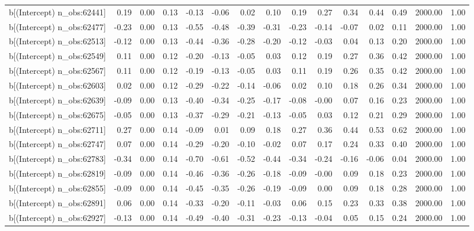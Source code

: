 \begin{table}[ht]
\begin{tabular}{rrrrrrrrrrrrrrr}
  b[(Intercept) n\_obs:62441] & 0.19 & 0.00 & 0.13 & -0.13 & -0.06 & 0.02 & 0.10 & 0.19 & 0.27 & 0.34 & 0.44 & 0.49 & 2000.00 & 1.00 \\ 
  b[(Intercept) n\_obs:62477] & -0.23 & 0.00 & 0.13 & -0.55 & -0.48 & -0.39 & -0.31 & -0.23 & -0.14 & -0.07 & 0.02 & 0.11 & 2000.00 & 1.00 \\ 
  b[(Intercept) n\_obs:62513] & -0.12 & 0.00 & 0.13 & -0.44 & -0.36 & -0.28 & -0.20 & -0.12 & -0.03 & 0.04 & 0.13 & 0.20 & 2000.00 & 1.00 \\ 
  b[(Intercept) n\_obs:62549] & 0.11 & 0.00 & 0.12 & -0.20 & -0.13 & -0.05 & 0.03 & 0.12 & 0.19 & 0.27 & 0.36 & 0.42 & 2000.00 & 1.00 \\ 
  b[(Intercept) n\_obs:62567] & 0.11 & 0.00 & 0.12 & -0.19 & -0.13 & -0.05 & 0.03 & 0.11 & 0.19 & 0.26 & 0.35 & 0.42 & 2000.00 & 1.00 \\ 
  b[(Intercept) n\_obs:62603] & 0.02 & 0.00 & 0.12 & -0.29 & -0.22 & -0.14 & -0.06 & 0.02 & 0.10 & 0.18 & 0.26 & 0.34 & 2000.00 & 1.00 \\ 
  b[(Intercept) n\_obs:62639] & -0.09 & 0.00 & 0.13 & -0.40 & -0.34 & -0.25 & -0.17 & -0.08 & -0.00 & 0.07 & 0.16 & 0.23 & 2000.00 & 1.00 \\ 
  b[(Intercept) n\_obs:62675] & -0.05 & 0.00 & 0.13 & -0.37 & -0.29 & -0.21 & -0.13 & -0.05 & 0.03 & 0.12 & 0.21 & 0.29 & 2000.00 & 1.00 \\ 
  b[(Intercept) n\_obs:62711] & 0.27 & 0.00 & 0.14 & -0.09 & 0.01 & 0.09 & 0.18 & 0.27 & 0.36 & 0.44 & 0.53 & 0.62 & 2000.00 & 1.00 \\ 
  b[(Intercept) n\_obs:62747] & 0.07 & 0.00 & 0.14 & -0.29 & -0.20 & -0.10 & -0.02 & 0.07 & 0.17 & 0.24 & 0.33 & 0.40 & 2000.00 & 1.00 \\ 
  b[(Intercept) n\_obs:62783] & -0.34 & 0.00 & 0.14 & -0.70 & -0.61 & -0.52 & -0.44 & -0.34 & -0.24 & -0.16 & -0.06 & 0.04 & 2000.00 & 1.00 \\ 
  b[(Intercept) n\_obs:62819] & -0.09 & 0.00 & 0.14 & -0.46 & -0.36 & -0.26 & -0.18 & -0.09 & -0.00 & 0.09 & 0.18 & 0.23 & 2000.00 & 1.00 \\ 
  b[(Intercept) n\_obs:62855] & -0.09 & 0.00 & 0.14 & -0.45 & -0.35 & -0.26 & -0.19 & -0.09 & 0.00 & 0.09 & 0.18 & 0.28 & 2000.00 & 1.00 \\ 
  b[(Intercept) n\_obs:62891] & 0.06 & 0.00 & 0.14 & -0.33 & -0.20 & -0.11 & -0.03 & 0.06 & 0.15 & 0.23 & 0.33 & 0.38 & 2000.00 & 1.00 \\ 
  b[(Intercept) n\_obs:62927] & -0.13 & 0.00 & 0.14 & -0.49 & -0.40 & -0.31 & -0.23 & -0.13 & -0.04 & 0.05 & 0.15 & 0.24 & 2000.00 & 1.00 \\ 

\end{tabular}
\end{table}
